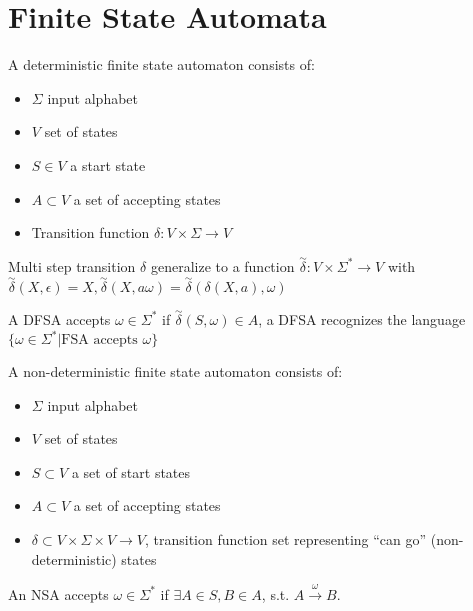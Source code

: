 
\section{Finite State Automata}

\begin{definition}\label{def:dfsa}
A deterministic finite state automaton consists of:

\begin{itemize}
\item \(\Sigma\) input alphabet
\item \(V\) set of states
\item \(S\in V\) a start state
\item \(A \subset V\) a set of accepting states
\item Transition function \(\delta: V \times \Sigma \rightarrow V\)
\end{itemize}
\end{definition}


Multi step transition \(\delta\) generalize to a function
\(\overset{\sim}{\delta}: V \times \Sigma^* \rightarrow V\) with
\(\overset{\sim}{\delta}(X, \epsilon) = X, \overset{\sim}{\delta}(X, a\omega)=\overset{\sim}{\delta}(\delta(X,a), \omega)\)

\begin{definition}
A DFSA accepts \(\omega \in \Sigma^*\) if
\(\overset{\sim}{\delta}(S, \omega) \in A\), a DFSA recognizes the language
\(\{\omega \in \Sigma^* | \text{FSA accepts }\omega\}\)
\end{definition}

\begin{definition}
A non-deterministic finite state automaton consists of:
\begin{itemize}
\item
  \(\Sigma\) input alphabet
\item
  \(V\) set of states

\item
  \(S\subset V\) a set of start states
\item
  \(A \subset V\) a set of accepting states
  \item
  \(\delta \subset V \times \Sigma \times V \rightarrow V\),
  transition function set representing ``can go'' (non-deterministic) states
\end{itemize}
\end{definition}

\begin{definition}
An NSA accepts \(\omega \in \Sigma^*\) if \(\exists A \in S, B \in A\),
s.t. \(A \overset{\omega}{\rightarrow} B\).
\end{definition}


